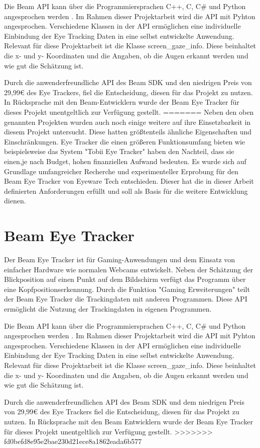 Die Beam {\ac{API}} kann über die Programmiersprachen C++, C, C\# und Python angesprochen werden \cite{lit_code_beam_sdk}. Im Rahmen dieser Projektarbeit wird die {\ac{API}} mit Pyhton angesprochen. Verschiedene Klassen in der {\ac{API}} ermöglichen eine individuelle Einbindung der Eye Tracking Daten in eine selbst entwickelte Anwendung. Relevant für diese Projektarbeit ist die Klasse \glqq{}screen\_gaze\_info\grqq{}. Diese beinhaltet die x- und y- Koordinaten und die Angaben, ob die Augen erkannt werden und wie gut die Schätzung ist.

Durch die anwenderfreundliche {\ac{API}} des Beam {\ac{SDK}} und den niedrigen Preis von 29,99€ des Eye Trackers, fiel die Entscheidung, diesen für das Projekt zu nutzen. In Rücksprache mit den Beam-Entwicklern wurde der Beam Eye Tracker für dieses Projekt unentgeltlich zur Verfügung gestellt.
=======
Neben den oben genannten Projekten wurden auch noch einige weitere auf ihre Einsetzbarkeit in diesem Projekt untersucht. Diese hatten größtenteils ähnliche Eigenschaften und Einschränkungen. Eye Tracker die einen größeren Funktionsumfang bieten wie beispielsweise das System "Tobii Eye Tracker" haben den Nachteil, dass sie einen,je nach Budget, hohen finanziellen Aufwand bedeuten. Es wurde sich auf Grundlage umfangreicher Recherche und experimenteller Erprobung für den Beam Eye Tracker von Eyeware Tech entschieden. Dieser hat die in dieser Arbeit definierten Anforderungen erfüllt und soll als Basis für die weitere Entwicklung dienen.

\section{Beam Eye Tracker}

Der Beam Eye Tracker ist für Gaming-Anwendungen und dem Einsatz von einfacher Hardware wie normalen Webcams entwickelt. Neben der Schätzung der Blickposition auf einen Punkt auf dem Bildschirm verfügt das Programm über eine Kopfpositionserkennung. Durch die Funktion "Gaming Erweiterungen" teilt der Beam Eye Tracker die Trackingdaten mit anderen Programmen. Diese {\ac{API}} ermöglicht die Nutzung der Trackingdaten in eigenen Programmen. 

Die Beam {\ac{API}} kann über die Programmiersprachen C++, C, C\# und Python angesprochen werden \cite{lit_code_beam_sdk}. Im Rahmen dieser Projektarbeit wird die {\ac{API}} mit Pyhton angesprochen. Verschiedene Klassen in der {\ac{API}} ermöglichen eine individuelle Einbindung der Eye Tracking Daten in eine selbst entwickelte Anwendung. Relevant für diese Projektarbeit ist die Klasse \glqq{}screen\_gaze\_info\grqq{}. Diese beinhaltet die x- und y- Koordinaten und die Angaben, ob die Augen erkannt werden und wie gut die Schätzung ist.

Durch die anwenderfreundlichen {\ac{API}} des Beam {\ac{SDK}} und dem niedrigen Preis von 29,99€ des Eye Trackers fiel die Entscheidung, diesen für das Projekt zu nutzen. In Rücksprache mit den Beam Entwicklern wurde der Beam Eye Tracker für dieses Projekt unentgeltlich zur Verfügung gestellt.
>>>>>>> fd0befd8e95e2bae230d21ece8a1862eada6b577
